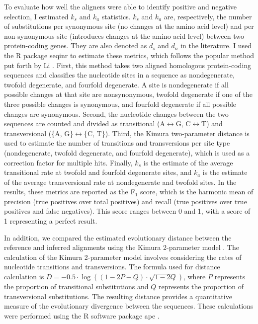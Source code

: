 \documentclass[12pt,letterpaper]{article}
\newcommand{\cyan}[1]{\textcolor{cyan}{#1}}
\begin{document}

To evaluate how well the aligners were able to identify positive and negative selection, I estimated $k_s$ and $k_a$ statistics. $k_s$ and $k_a$ are, respectively, the number of substitutions per synonymous site (no changes at the amino acid level) and per non-synonymous site (introduces changes at the amino acid level) between two protein-coding genes. They are also denoted as $d_s$ and $d_n$ in the literature. I used the R package seqinr \citep{seqinr} to estimate these metrics, which follows the popular method put forth by Li \citep{ka_ks_li_1993}. First, this method takes two aligned homologous protein-coding sequences and classifies the nucleotide sites in a sequence as nondegenerate, twofold degenerate, and fourfold degenerate. A site is nondegenerate if all possible changes at that site are nonsynonymous, twofold degenerate if one of the three possible changes is synonymous, and fourfold degenerate if all possible changes are synonymous. Second, the nucleotide changes between the two sequences are counted and divided as transitional (A$\leftrightarrow$G, C$\leftrightarrow$T) and transversional (\{A, G\}$\leftrightarrow$\{C, T\}). Third, the Kimura two-parameter distance \citep{kimura1980simple} is used to estimate the number of transitions and transversions per site type (nondegenerate, twofold degenerate, and fourfold degenerate), which is used as a correction factor for multiple hits. Finally, $k_s$ is the estimate of the average transitional rate at twofold and fourfold degenerate sites, and $k_a$ is the estimate of the average transversional rate at nondegenerate and twofold sites. In the results, these metrics are reported as the F$_1$ score, which is the harmonic mean of precision (true positives over total positives) and recall (true positives over true positives and false negatives). This score ranges between 0 and 1, with a score of 1 representing a perfect result.

In addition, we compared the estimated evolutionary distance between the reference and inferred alignments using the Kimura 2-parameter model \citep{kimura1980simple}. The calculation of the Kimura 2-parameter model involves considering the rates of nucleotide transitions and transversions. The formula used for distance calculation is $D = -0.5 \cdot \log((1 - 2P - Q) \cdot \sqrt{1 - 2Q})$, where $P$ represents the proportion of transitional substitutions and $Q$ represents the proportion of transversional substitutions. The resulting distance provides a quantitative measure of the evolutionary divergence between the sequences. These calculations were performed using the R software package ape \citep{paradis2019ape}.
\end{document}
